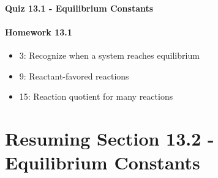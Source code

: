 \documentclass[12pt, openany, letterpaper]{memoir}
\begin{document}
\paragraph*{Quiz 13.1 - Equilibrium Constants}
\paragraph*{Homework 13.1}
\begin{itemize}
  \item 3: Recognize when a system reaches equilibrium
  \item 9: Reactant-favored reactions
  \item 15: Reaction quotient for many reactions
\end{itemize}

\section*{Resuming Section 13.2 - Equilibrium Constants}
\end{document}
